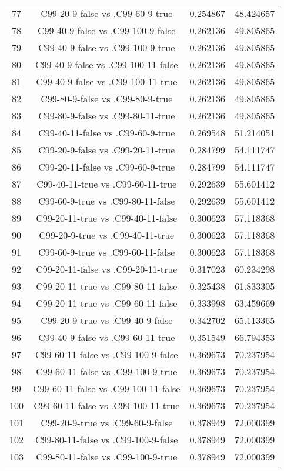 \documentclass[a4paper,10pt]{article}
\begin{document}
\begin{landscape}
\begin{table}[!htp]
\begin{tabular}{cccc}
77&C99-20-9-false vs .C99-60-9-true&0.254867&48.424657\\
78&C99-40-9-false vs .C99-100-9-false&0.262136&49.805865\\
79&C99-40-9-false vs .C99-100-9-true&0.262136&49.805865\\
80&C99-40-9-false vs .C99-100-11-false&0.262136&49.805865\\
81&C99-40-9-false vs .C99-100-11-true&0.262136&49.805865\\
82&C99-80-9-false vs .C99-80-9-true&0.262136&49.805865\\
83&C99-80-9-false vs .C99-80-11-true&0.262136&49.805865\\
84&C99-40-11-false vs .C99-60-9-true&0.269548&51.214051\\
85&C99-20-9-false vs .C99-20-11-true&0.284799&54.111747\\
86&C99-20-11-false vs .C99-60-9-true&0.284799&54.111747\\
87&C99-40-11-true vs .C99-60-11-true&0.292639&55.601412\\
88&C99-60-9-true vs .C99-80-11-false&0.292639&55.601412\\
89&C99-20-11-true vs .C99-40-11-false&0.300623&57.118368\\
90&C99-20-9-true vs .C99-40-11-true&0.300623&57.118368\\
91&C99-60-9-true vs .C99-60-11-false&0.300623&57.118368\\
92&C99-20-11-false vs .C99-20-11-true&0.317023&60.234298\\
93&C99-20-11-true vs .C99-80-11-false&0.325438&61.833305\\
94&C99-20-11-true vs .C99-60-11-false&0.333998&63.459669\\
95&C99-20-9-true vs .C99-40-9-false&0.342702&65.113365\\
96&C99-40-9-false vs .C99-60-11-true&0.351549&66.794353\\
97&C99-60-11-false vs .C99-100-9-false&0.369673&70.237954\\
98&C99-60-11-false vs .C99-100-9-true&0.369673&70.237954\\
99&C99-60-11-false vs .C99-100-11-false&0.369673&70.237954\\
100&C99-60-11-false vs .C99-100-11-true&0.369673&70.237954\\
101&C99-20-9-true vs .C99-60-9-false&0.378949&72.000399\\
102&C99-80-11-false vs .C99-100-9-false&0.378949&72.000399\\
103&C99-80-11-false vs .C99-100-9-true&0.378949&72.000399\\

\end{tabular}
\end{table}
\end{landscape}
\end{document}
